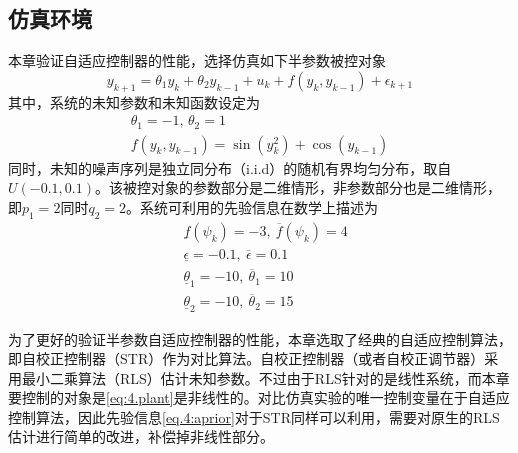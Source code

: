 \subsection{仿真环境}\label{sect:4.4.1}
本章验证自适应控制器的性能，选择仿真如下半参数被控对象
\begin{equation}\label{eq:4.plant}
y_{k+1} = \theta_{1}y_{k} + \theta_{2}y_{k-1} + u_{k} + f(y_{k},y_{k-1}) + \epsilon_{k+1} 
\end{equation}
其中，系统的未知参数和未知函数设定为
\begin{equation}
\begin{array}{c}
\theta_{1} = -1\textbf{, }\theta_{2} = 1\\
f(y_{k},y_{k-1}) = \sin(y_{k}^{2}) + \cos(y_{k-1})
\end{array}
\end{equation}
同时，未知的噪声序列是独立同分布（i.i.d）的随机有界均匀分布，取自$U(-0.1,0.1)$。该被控对象的参数部分是二维情形，非参数部分也是二维情形，即$p_{1}=2$同时$q_{2}=2$。系统可利用的先验信息在数学上描述为
\begin{equation}\label{eq.4:aprior}
\begin{split}
&\underline{f}(\psi_{k})=-3,\ \overline{f}(\psi_{k})=4\\
&\underline{\epsilon}=-0.1,\ \overline{\epsilon}=0.1\\
&\underline{\theta}_{1}=-10,\ \overline{\theta}_{1}=10\\
&\underline{\theta}_{2}=-10,\ \overline{\theta}_{2}=15
\end{split}
\end{equation}

为了更好的验证半参数自适应控制器的性能，本章选取了经典的自适应控制算法，即自校正控制器（STR）作为对比算法。自校正控制器（或者自校正调节器）采用最小二乘算法（RLS）估计未知参数。不过由于RLS针对的是线性系统，而本章要控制的对象是\eqref{eq:4.plant}是非线性的。对比仿真实验的唯一控制变量在于自适应控制算法，因此先验信息\eqref{eq.4:aprior}对于STR同样可以利用，需要对原生的RLS估计进行简单的改进，补偿掉非线性部分。

